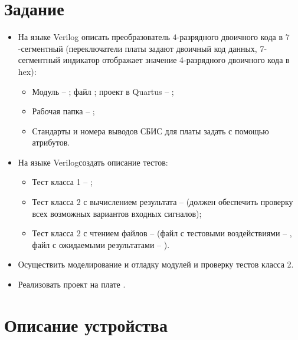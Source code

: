 





\tableofcontents
\lstlistoflistings
\listoffigures
\newpage

\section{Задание}

\begin{itemize}
	\item На языке Verilog описать преобразователь $4$-разрядного двоичного кода в $7$-сегментный (переключатели платы  задают двоичный код данных, 7-сегментный индикатор отображает значение 4-разрядного двоичного кода в hex):
		\begin{itemize}
			\item Модуль -- ; файл ; проект в Quartus -- ;
			\item Рабочая папка -- ;
			\item Стандарты и номера выводов СБИС для платы  задать с помощью атрибутов.
		\end{itemize}
	
	\item На языке Verilogсоздать описание тестов:
		\begin{itemize}
			\item Тест класса 1 -- ;
			\item Тест класса 2 с вычислением результата --  (должен обеспечить проверку всех возможных вариантов входных сигналов);
			\item Тест класса 2 с чтением файлов --  (файл с тестовыми воздействиями -- , файл с ожидаемыми результатами -- ).
		\end{itemize}
	
	\item Осуществить моделирование и отладку модулей и проверку тестов класса 2.
	
	\item Реализовать проект на плате .
\end{itemize}

\section{Описание устройства}

